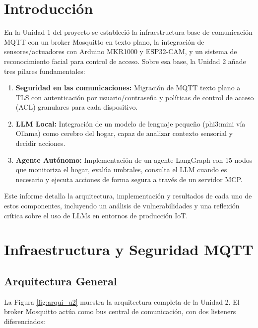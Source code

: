 \documentclass[12pt,letterpaper]{article}
\begin{document}
\section{Introducción}

En la Unidad 1 del proyecto se estableció la infraestructura base de comunicación MQTT con un broker Mosquitto en texto plano, la integración de sensores/actuadores con Arduino MKR1000 y ESP32-CAM, y un sistema de reconocimiento facial para control de acceso. Sobre esa base, la Unidad 2 añade tres pilares fundamentales:

\begin{enumerate}
    \item \textbf{Seguridad en las comunicaciones:} Migración de MQTT texto plano a TLS con autenticación por usuario/contraseña y políticas de control de acceso (ACL) granulares para cada dispositivo.
    \item \textbf{LLM Local:} Integración de un modelo de lenguaje pequeño (phi3:mini vía Ollama) como cerebro del hogar, capaz de analizar contexto sensorial y decidir acciones.
    \item \textbf{Agente Autónomo:} Implementación de un agente LangGraph con 15 nodos que monitoriza el hogar, evalúa umbrales, consulta el LLM cuando es necesario y ejecuta acciones de forma segura a través de un servidor MCP.
\end{enumerate}

Este informe detalla la arquitectura, implementación y resultados de cada uno de estos componentes, incluyendo un análisis de vulnerabilidades y una reflexión crítica sobre el uso de LLMs en entornos de producción IoT.

\newpage

\section{Infraestructura y Seguridad MQTT}

\subsection{Arquitectura General}

La Figura \ref{fig:arqui_u2} muestra la arquitectura completa de la Unidad 2. El broker Mosquitto actúa como bus central de comunicación, con dos listeners diferenciados:
\end{document}
